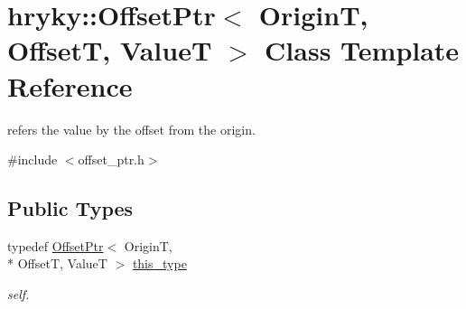 \hypertarget{classhryky_1_1_offset_ptr}{\section{hryky\-:\-:Offset\-Ptr$<$ Origin\-T, Offset\-T, Value\-T $>$ Class Template Reference}
\label{classhryky_1_1_offset_ptr}
}


refers the value by the offset from the origin.  




{\ttfamily \#include $<$offset\-\_\-ptr.\-h$>$}

\subsection*{Public Types}
\begin{DoxyCompactItemize}
\item 
\hypertarget{classhryky_1_1_offset_ptr_a73a85221d5352162be046159f4aea008}{typedef \hyperlink{classhryky_1_1_offset_ptr}{Offset\-Ptr}$<$ Origin\-T, \\*
Offset\-T, Value\-T $>$ \hyperlink{classhryky_1_1_offset_ptr_a73a85221d5352162be046159f4aea008}{this\-\_\-type}}\label{classhryky_1_1_offset_ptr_a73a85221d5352162be046159f4aea008}

\begin{DoxyCompactList}\small\item\em self. \end{DoxyCompactList}\end{DoxyCompactItemize}
